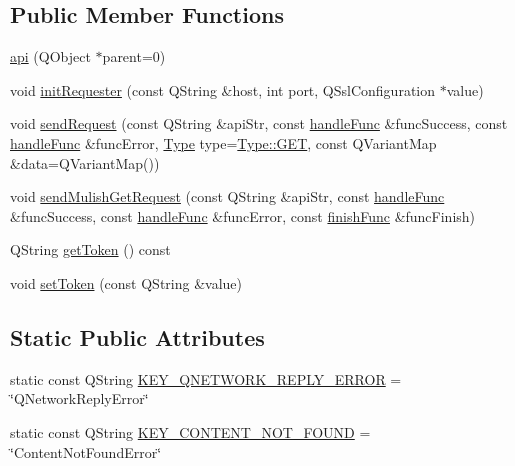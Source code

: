 \subsection*{Public Member Functions}
\begin{DoxyCompactItemize}
\item 
\hyperlink{classapi_a9f11e9765a217f8f00b033db1592240d}{api} (Q\+Object $\ast$parent=0)
\item 
void \hyperlink{classapi_a40e8532ca785ffc40fbb3817634f5c47}{init\+Requester} (const Q\+String \&host, int port, Q\+Ssl\+Configuration $\ast$value)
\item 
void \hyperlink{classapi_a9ad02a2accb85926d1fe90097accc449}{send\+Request} (const Q\+String \&api\+Str, const \hyperlink{classapi_ae177be144c99e5b642bc435ff14f91eb}{handle\+Func} \&func\+Success, const \hyperlink{classapi_ae177be144c99e5b642bc435ff14f91eb}{handle\+Func} \&func\+Error, \hyperlink{classapi_a4d626d9c11b80e532928299e68ff5bd9}{Type} type=\hyperlink{classapi_a4d626d9c11b80e532928299e68ff5bd9a7528035a93ee69cedb1dbddb2f0bfcc8}{Type\+::\+G\+ET}, const Q\+Variant\+Map \&data=Q\+Variant\+Map())
\item 
void \hyperlink{classapi_a6c6d36ada6917ef547c09008b84d9207}{send\+Mulish\+Get\+Request} (const Q\+String \&api\+Str, const \hyperlink{classapi_ae177be144c99e5b642bc435ff14f91eb}{handle\+Func} \&func\+Success, const \hyperlink{classapi_ae177be144c99e5b642bc435ff14f91eb}{handle\+Func} \&func\+Error, const \hyperlink{classapi_ac68be0fe2ba36f25c4f776b1eeff0482}{finish\+Func} \&func\+Finish)
\item 
Q\+String \hyperlink{classapi_a9758ebb4b428a4b34d6281785e24dfba}{get\+Token} () const
\item 
void \hyperlink{classapi_a9094273ad3a3e9455e22ebcb47ce4773}{set\+Token} (const Q\+String \&value)
\end{DoxyCompactItemize}
\subsection*{Static Public Attributes}
\begin{DoxyCompactItemize}
\item 
static const Q\+String \hyperlink{classapi_a697932895aadaf71414e4a12c9edc339}{K\+E\+Y\+\_\+\+Q\+N\+E\+T\+W\+O\+R\+K\+\_\+\+R\+E\+P\+L\+Y\+\_\+\+E\+R\+R\+OR} = \char`\"{}Q\+Network\+Reply\+Error\char`\"{}
\item 
static const Q\+String \hyperlink{classapi_a027285454c3fa18bdab800db4ec9a632}{K\+E\+Y\+\_\+\+C\+O\+N\+T\+E\+N\+T\+\_\+\+N\+O\+T\+\_\+\+F\+O\+U\+ND} = \char`\"{}Content\+Not\+Found\+Error\char`\"{}
\end{DoxyCompactItemize}


